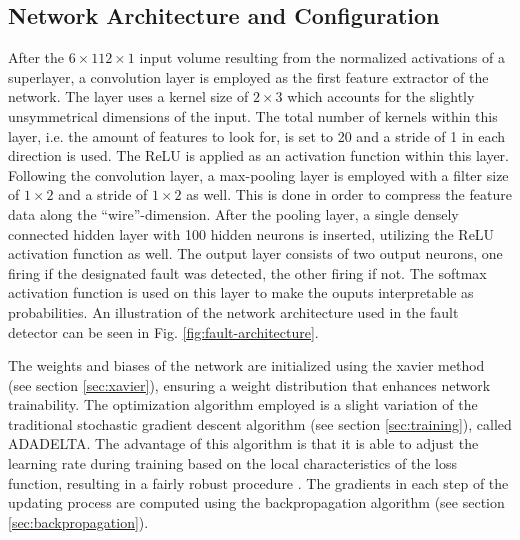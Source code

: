 \subsection{Network Architecture and Configuration}

After the \(6 \times 112 \times 1\) input volume resulting from the
normalized activations of a superlayer, a convolution layer
is employed as the first feature extractor of the network. The layer
uses a kernel size of \(2 \times 3\) which accounts for the slightly
unsymmetrical dimensions of the input. The total number of kernels
within this layer, i.e. the amount of features to look for, is set to
20 and a stride of 1 in each direction is used. The ReLU is applied
as an activation function within this layer.
Following the convolution layer, a max-pooling layer is employed with a
filter size of \(1 \times 2\) and a stride of \(1 \times 2\) as
well. This is done in order to compress the feature data along the
``wire''-dimension. After the pooling layer, a single densely
connected hidden layer with 100 hidden neurons is inserted, utilizing
the ReLU activation function as well. The output layer consists of two
output neurons, one firing if the designated fault was detected, the
other firing if not. The softmax activation function is used on this
layer to make the ouputs interpretable as probabilities. An
illustration of the network architecture used in the fault detector
can be seen in Fig. \ref{fig:fault-architecture}.

The weights and biases of the network are initialized using the xavier
method (see section \ref{sec:xavier}), ensuring a weight distribution
that enhances network trainability. The optimization algorithm
employed is a slight variation of the traditional stochastic gradient
descent algorithm (see section \ref{sec:training}), called
ADADELTA. The advantage of this algorithm is that it is able to adjust
the learning rate during training based on the local characteristics
of the loss function, resulting in a fairly robust procedure
\cite{adadelta}. The gradients in each step of the updating process
are computed using the backpropagation algorithm (see section
\ref{sec:backpropagation}).

